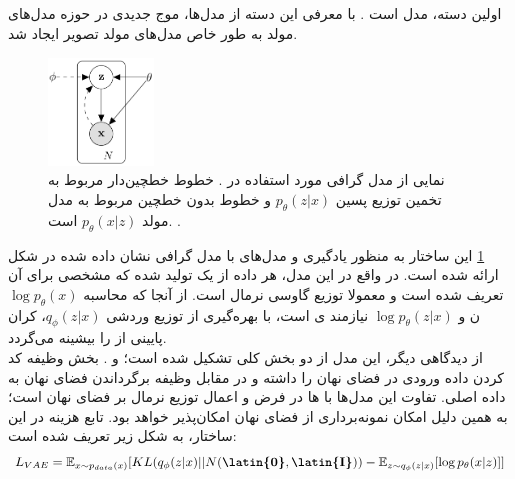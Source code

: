 \subsection{\vae{}}
اولین دسته، مدل  است \cite{vae-org}. با معرفی این دسته از مدل‌ها، موج جدیدی در حوزه مدل‌های مولد به طور خاص مدل‌های مولد تصویر ایجاد شد.
\begin{figure}[H]
	\centering
	\includegraphics[width=0.25\textwidth]{images/vae-pgm.png}
	\caption{
		نمایی از مدل گرافی مورد استفاده در \vae{}. خطوط خطچین‌‌دار مربوط به تخمین توزیع پسین $p_\theta(z|x)$ و خطوط بدون خطچین مربوط به مدل مولد $p_\theta(x|z)$ است.
		\cite{vae-text}.}
	\label{fig:vae-pgm}
\end{figure}
این ساختار به منظور یادگیری و  مدل‌های با مدل گرافی نشان داده شده در شکل ‎\ref{fig:vae-pgm}‎ ارائه شده است. در واقع در این مدل، هر داده از یک   تولید شده که \priordist{} مشخصی برای آن تعریف شده است و معمولا توزیع گاوسی نرمال است. از آنجا که محاسبه $\log p_\theta(x)$ ن و $\log p_\theta (z|x)$ نیازمند \inference ی  است، با بهره‌گیری از  توزیع وردشی $q_\phi(z|x)$، کران پایینی از \likelihood{} را بیشینه می‌گردد.\\
از دیدگاهی دیگر، این مدل از دو بخش کلی تشکیل شده است؛  و . بخش \encoder{} وظیفه کد کردن داده ورودی در فضای نهان را داشته و در مقابل \decoder{} وظیفه برگرداندن فضای نهان به داده اصلی. تفاوت این مدل‌ها با ها در فرض و اعمال توزیع نرمال بر فضای نهان است؛ به همین دلیل امکان نمونه‌برداری از فضای نهان امکان‌پذیر خواهد بود. تابع هزینه در این ساختار، به شکل زیر تعریف شده است:
\begin{equation} \label{eq:vae}
	\begin{split}
		L_{VAE} = \expected_{x \sim p_{data}(x)} [KL(q_\phi(z|x) || N(\textbf{\latin{0}},\textbf{\latin{I}}))- \expected_{z \sim q_\phi(z|x)}[\log p_\theta(x|z)]]
	\end{split}
\end{equation}


